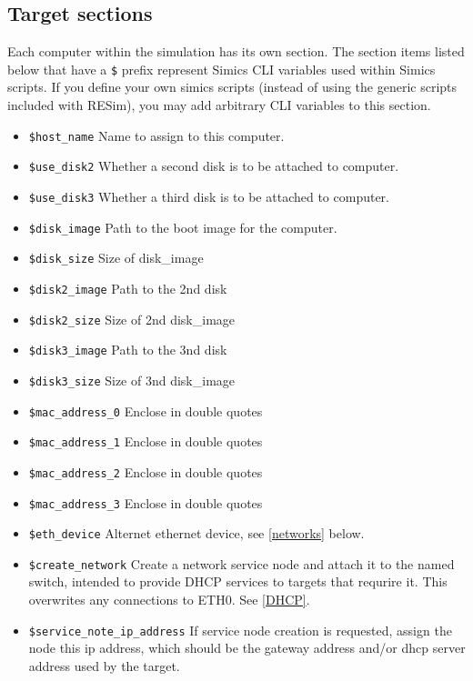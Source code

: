 \documentclass[titlepage]{article}
\begin{document}
\subsection{Target sections}
Each computer within the simulation has its own section. The section items listed below that 
have a {\tt \$} prefix represent Simics CLI variables used within Simics scripts.  If you define your own
simics scripts (instead of using the generic scripts included with RESim), you may add arbitrary CLI variables
to this section. 
\begin{itemize}
\item {\tt \$host\_name} Name to assign to this computer.
\item {\tt \$use\_disk2} Whether a second disk is to be attached to computer.
\item {\tt \$use\_disk3} Whether a third disk is to be attached to computer.
\item {\tt \$disk\_image} Path to the boot image for the computer.
\item {\tt \$disk\_size} Size of disk\_image
\item {\tt \$disk2\_image} Path to the 2nd disk
\item {\tt \$disk2\_size} Size of 2nd disk\_image
\item {\tt \$disk3\_image} Path to the 3nd disk
\item {\tt \$disk3\_size} Size of 3nd disk\_image
\item {\tt \$mac\_address\_0} Enclose in double quotes
\item {\tt \$mac\_address\_1} Enclose in double quotes
\item {\tt \$mac\_address\_2} Enclose in double quotes
\item {\tt \$mac\_address\_3} Enclose in double quotes
\item {\tt \$eth\_device} Alternet ethernet device, see \ref{networks} below.
\item {\tt \$create\_network} Create a network service node and attach it to the named switch, intended
to provide DHCP services to targets that requrire it. This overwrites any connections to ETH0.  See \ref{DHCP}.
\item {\tt \$service\_note\_ip\_address} If service node creation is requested, assign the node this ip address, which
should be the gateway address and/or dhcp server address used by the target.


\end{itemize}
\end{document}
